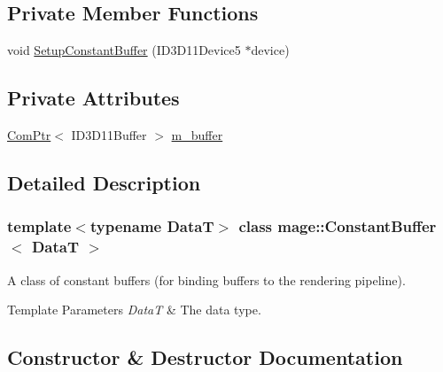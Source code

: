 \subsection*{Private Member Functions}
\begin{DoxyCompactItemize}
\item 
void \hyperlink{classmage_1_1_constant_buffer_a52e82d01bd000ff314c33bfdc350c67e}{Setup\+Constant\+Buffer} (I\+D3\+D11\+Device5 $\ast$device)
\end{DoxyCompactItemize}
\subsection*{Private Attributes}
\begin{DoxyCompactItemize}
\item 
\hyperlink{namespacemage_ae74f374780900893caa5555d1031fd79}{Com\+Ptr}$<$ I\+D3\+D11\+Buffer $>$ \hyperlink{classmage_1_1_constant_buffer_a394571e3102fe053f3357e2e218c0eda}{m\+\_\+buffer}
\end{DoxyCompactItemize}


\subsection{Detailed Description}
\subsubsection*{template$<$typename DataT$>$\newline
class mage\+::\+Constant\+Buffer$<$ Data\+T $>$}

A class of constant buffers (for binding buffers to the rendering pipeline).


\begin{DoxyTemplParams}{Template Parameters}
{\em DataT} & The data type. \\
\hline
\end{DoxyTemplParams}


\subsection{Constructor \& Destructor Documentation}
\hypertarget{classmage_1_1_constant_buffer_a3badd88f8570d6622f6eb33c7420a87d}{}\label{classmage_1_1_constant_buffer_a3badd88f8570d6622f6eb33c7420a87d} 
